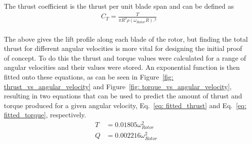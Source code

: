         The thrust coefficient is the thrust per unit blade span and can be defined as
        \begin{align}
            &C_T= \frac{T}{\pi R^2 \rho (\omega_{Rotor} R).^2}
        \end{align}
        \\
        The above gives the lift profile along each blade of the rotor, but finding the total thrust for different angular velocities is more vital for designing the initial proof of concept. To do this the thrust and torque values were calculated for a range of angular velocities and their values were stored. An exponential function is then fitted onto these equations, as can be seen in Figure~\ref{fig: thrust_vs_angular_velocity} and Figure~\ref{fig: torque_vs_angular_velocity}, resulting in two equations that can be used to predict the amount of thrust and torque produced for a given angular velocity, Eq.~\ref{eq: fitted_thrust} and Eq.~\ref{eq: fitted_torque}, respectively.
        \begin{align}
            T &= 0.01805 \omega_{Rotor} ^2 \label{eq: fitted_thrust}\\
            Q &= 0.002216 \omega_{Rotor} ^2 \label{eq: fitted_torque}
        \end{align}


